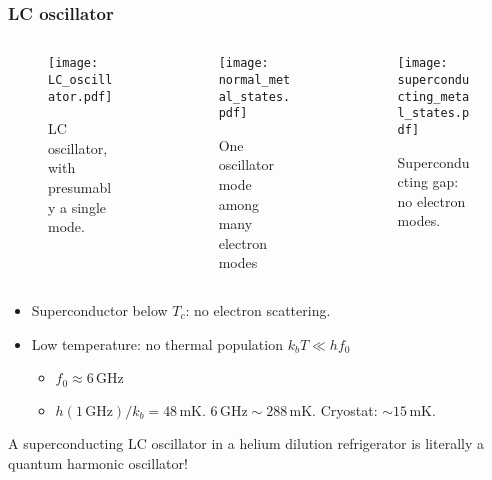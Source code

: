 \begin{frame}
\frametitle{LC oscillator}
\begin{columns}
  \begin{column}{0.3\textwidth}
  \begin{figure}
  \texttt{[image: LC\_oscillator.pdf]}
  \caption*{LC oscillator, with presumably a single mode.}
  \end{figure}
  \end{column}
  \begin{column}{0.3\textwidth}
  \begin{figure}
  \texttt{[image: normal\_metal\_states.pdf]}
  \caption*{One oscillator mode among many electron modes}
  \end{figure}
  \end{column}
  \begin{column}{0.3\textwidth}
  \begin{figure}
  \texttt{[image: superconducting\_metal\_states.pdf]}
  \caption*{Superconducting gap: no electron modes.}
  \end{figure}
  \end{column}
\end{columns}

\pause
\begin{itemize}
  \item Superconductor below $T_c$: no electron scattering.
  \pause
  \item Low temperature: no thermal population $k_b T \ll h f_0$
  \begin{itemize}
    \item $f_0 \approx 6\,\text{GHz}$
    \item $h (1\,\text{GHz}) / k_b = 48 \, \text{mK}$. $6\, \text{GHz} \sim 288 \, \text{mK}$. Cryostat: $\sim 15\, \text{mK}$.
  \end{itemize}
\end{itemize}

\pause
A superconducting LC oscillator in a helium dilution refrigerator is literally a quantum harmonic oscillator!
\end{frame}
